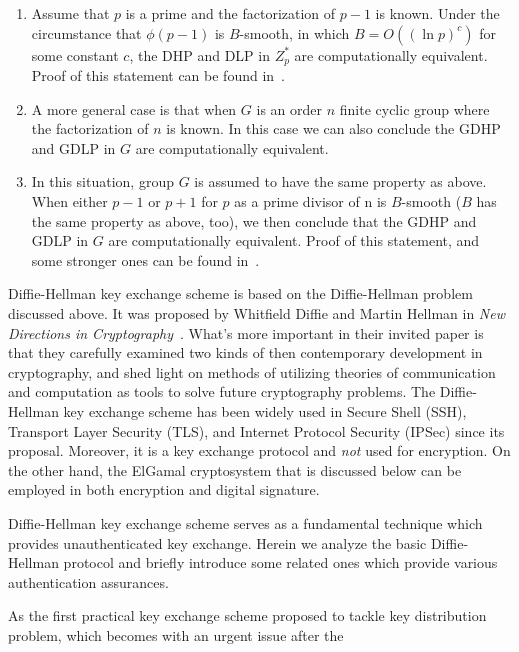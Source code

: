 \documentclass[12pt,journal,compsoc]{IEEEtran}
\begin{document}
\begin{enumerate}
\item Assume that $p$ is a prime and the factorization of $p-1$ is
  known. Under the circumstance that $\phi(p-1)$ is $B$-smooth, in
  which $B=O((\ln p)^{c})$ for some constant $c$, the DHP and DLP in
  $Z^{*}_{p}$ are computationally equivalent. Proof of this statement
  can be found in~\cite{ref:Boer1990}.
\item A more general case is that when $G$ is an order $n$ finite
  cyclic group where the factorization of $n$ is known. In this case
  we can also conclude the GDHP and GDLP in $G$ are computationally
  equivalent. 
\item In this situation, group $G$ is assumed to have the same
  property as above. When either $p-1$ or $p+1$ for $p$ as a prime
  divisor of n is $B$-smooth ($B$ has the same property as above,
  too), we then conclude that the GDHP and GDLP in $G$ are
  computationally equivalent. Proof of this statement, and some
  stronger ones can be found in~\cite{ref:Maurer1994}.
\end{enumerate}
\par
Diffie-Hellman key exchange scheme is based on the Diffie-Hellman
problem discussed above. It was proposed by Whitfield Diffie and
Martin Hellman in \emph{New Directions in
  Cryptography}~\cite{ref:Diffie1976}. What's more important in
their invited paper is that they carefully examined two kinds of then
contemporary development in cryptography, and shed light on methods of
utilizing theories of communication and computation as tools to solve
future cryptography problems. The Diffie-Hellman key exchange scheme
has been widely used in Secure Shell (SSH), Transport Layer Security
(TLS), and Internet Protocol Security (IPSec) since its
proposal. Moreover, it is a key exchange protocol and \emph{not} used
for encryption. On the other hand, the ElGamal cryptosystem that is
discussed below can be employed in both encryption and digital
signature.
\par
Diffie-Hellman key exchange scheme serves as a fundamental technique
which provides unauthenticated key exchange. Herein we analyze the
basic Diffie-Hellman protocol and briefly introduce some related ones
which provide various authentication assurances.
\par
As the first practical key exchange scheme proposed to tackle key
distribution problem, which becomes with an urgent issue after the
\end{document}
